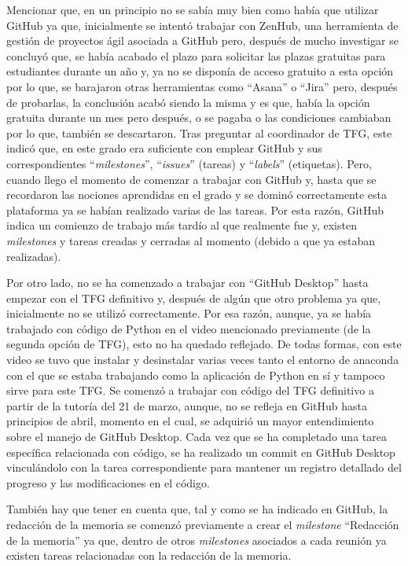 Mencionar que, en un principio no se sabía muy bien como había que utilizar GitHub ya que, inicialmente se intentó trabajar con ZenHub, una herramienta de gestión de proyectos ágil asociada a  GitHub pero, después de mucho investigar se concluyó que, se había acabado el plazo para solicitar las plazas gratuitas para estudiantes durante un año y, ya no se disponía de acceso gratuito a esta opción por lo que, se barajaron otras herramientas como ``Asana'' o ``Jira'' pero, después de probarlas, la conclusión acabó siendo la misma y es que, había la opción gratuita durante un mes pero después, o se pagaba o las condiciones cambiaban por lo que, también se descartaron. Tras preguntar al coordinador de TFG, este indicó que, en este grado era suficiente con emplear GitHub y sus correspondientes ``\textit{milestones}'', ``\textit{issues}'' (tareas) y ``\textit{labels}'' (etiquetas). Pero, cuando llego el momento de comenzar a trabajar con GitHub y, hasta que se recordaron las nociones aprendidas en el grado y se dominó correctamente esta plataforma ya se habían realizado varias de las tareas. Por esta razón, GitHub indica un comienzo de trabajo más tardío al que realmente fue y, existen \textit{milestones} y tareas creadas y cerradas al momento (debido a que ya estaban realizadas).

Por otro lado, no se ha comenzado a trabajar con ``GitHub Desktop'' hasta empezar con el TFG definitivo y, después de algún que otro problema ya que, inicialmente no se utilizó correctamente. Por esa razón, aunque, ya se había trabajado con código de Python en el video mencionado previamente (de la segunda opción de TFG), esto no ha quedado reflejado. De todas formas, con este video se tuvo que instalar y desinstalar varias veces tanto el entorno de anaconda con el que se estaba trabajando como la aplicación de Python en sí y tampoco sirve para este TFG. Se comenzó a trabajar con código del TFG definitivo a partir de la tutoría del 21 de marzo, aunque, no se refleja en GitHub hasta principios de abril, momento en el cual, se adquirió un mayor entendimiento sobre el manejo de GitHub Desktop. Cada vez que se ha completado una tarea específica relacionada con código, se ha realizado un commit en GitHub Desktop vinculándolo con la tarea correspondiente para mantener un registro detallado del progreso y las modificaciones en el código.

También hay que tener en cuenta que, tal y como se ha indicado en GitHub, la redacción de la memoria se comenzó previamente a crear el \textit{milestone} ``Redacción de la memoria'' ya que, dentro de otros \textit{milestones} asociados a cada reunión ya existen tareas relacionadas con la redacción de la memoria. 

